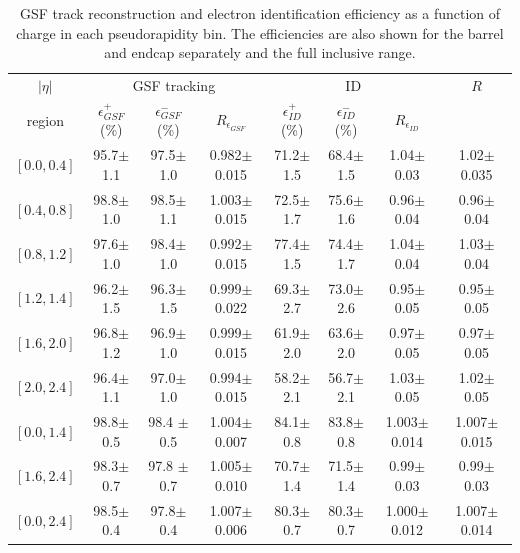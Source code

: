 \begin{table}[htbp]
\begin{center}
\begin{sideways}
\begin{tabular}{cccccccc}
    \toprule
$|\eta|$  & \multicolumn{3}{c}{GSF tracking } & \multicolumn{3}{c}{ID } & $R$ \\
region    & $\epsilon_{GSF}^+$ (\%) &$\epsilon_{GSF}^-$ (\%) & $R_{\epsilon_{GSF}}$ 
                                              & $\epsilon_{ID}^+$ (\%) &$\epsilon_{ID}^-$ (\%) & $R_{\epsilon_{ID}}$ &  \\
\midrule
$\left[ 0.0,0.4 \right]$ & 95.7$\pm$1.1 & 97.5$\pm$1.0 & 0.982$\pm$0.015 & 71.2$\pm$1.5 & 68.4$\pm$1.5 & 1.04$\pm$0.03 &1.02$\pm$0.035  \\
$\left[ 0.4,0.8 \right]$ & 98.8$\pm$ 1.0& 98.5$\pm$1.1 & 1.003$\pm$0.015 & 72.5$\pm$1.7 & 75.6$\pm$1.6 & 0.96$\pm$0.04 &0.96$\pm$ 0.04 \\
$\left[ 0.8,1.2 \right]$ & 97.6$\pm$ 1.0& 98.4$\pm$1.0 & 0.992$\pm$0.015 & 77.4$\pm$1.5 & 74.4$\pm$1.7 & 1.04$\pm$0.04 &1.03$\pm$ 0.04 \\
$\left[ 1.2,1.4 \right]$ & 96.2$\pm$ 1.5& 96.3$\pm$1.5 & 0.999$\pm$0.022 & 69.3$\pm$2.7 & 73.0$\pm$2.6 & 0.95$\pm$0.05 &0.95$\pm$0.05  \\
$\left[ 1.6,2.0 \right]$ & 96.8$\pm$ 1.2& 96.9$\pm$1.0 & 0.999$\pm$0.015 & 61.9$\pm$2.0 & 63.6$\pm$2.0 & 0.97$\pm$0.05 &0.97$\pm$0.05  \\
$\left[ 2.0,2.4 \right]$ & 96.4$\pm$ 1.1& 97.0$\pm$1.0 & 0.994$\pm$0.015 & 58.2$\pm$2.1 & 56.7$\pm$2.1 & 1.03$\pm$0.05 &1.02$\pm$0.05  \\
\midrule
$\left[ 0.0,1.4 \right]$ & 98.8$\pm$0.5 & 98.4 $\pm$0.5 & 1.004$\pm$0.007 & 84.1$\pm$0.8 & 83.8$\pm$0.8 & 1.003$\pm$0.014 & 1.007$\pm$ 0.015 \\
$\left[ 1.6,2.4 \right]$ & 98.3$\pm$0.7 & 97.8 $\pm$0.7 & 1.005$\pm$0.010 & 70.7$\pm$1.4 & 71.5$\pm$1.4 & 0.99$\pm$0.03 &0.99$\pm$ 0.03 \\
\midrule 
$\left[ 0.0,2.4 \right]$ & 98.5$\pm$0.4 & 97.8$\pm$0.4 & 1.007$\pm$0.006 & 80.3$\pm$0.7 & 80.3$\pm$0.7 & 1.000$\pm$0.012 &1.007$\pm$0.014  \\
    \bottomrule
\end{tabular}
\end{sideways}
\end{center}
\caption{{GSF} track reconstruction and electron identification efficiency as
a function of charge in each pseudorapidity bin. The efficiencies are also shown
for the barrel and endcap separately and the full inclusive range\cite{baisini2010electron}.}
\label{tab:tagprobe}
\end{table}

